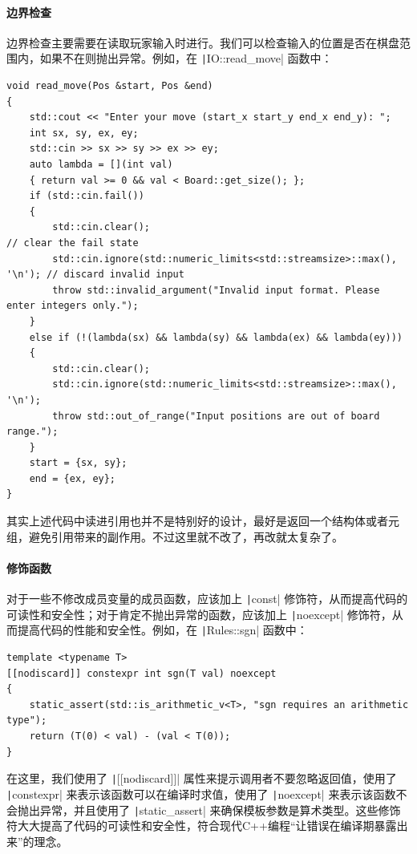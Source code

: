 \paragraph{边界检查} 
边界检查主要需要在读取玩家输入时进行。我们可以检查输入的位置是否在棋盘范围内，如果不在则抛出异常。例如，在 \texttt|IO::read_move| 函数中：
\begin{verbatim}
void read_move(Pos &start, Pos &end)
{
    std::cout << "Enter your move (start_x start_y end_x end_y): ";
    int sx, sy, ex, ey;
    std::cin >> sx >> sy >> ex >> ey;
    auto lambda = [](int val)
    { return val >= 0 && val < Board::get_size(); };
    if (std::cin.fail())
    {
        std::cin.clear();                                                   // clear the fail state
        std::cin.ignore(std::numeric_limits<std::streamsize>::max(), '\n'); // discard invalid input
        throw std::invalid_argument("Invalid input format. Please enter integers only.");
    }
    else if (!(lambda(sx) && lambda(sy) && lambda(ex) && lambda(ey)))
    {
        std::cin.clear();
        std::cin.ignore(std::numeric_limits<std::streamsize>::max(), '\n');
        throw std::out_of_range("Input positions are out of board range.");
    }
    start = {sx, sy};
    end = {ex, ey};
}
\end{verbatim}
其实上述代码中读进引用也并不是特别好的设计，最好是返回一个结构体或者元组，避免引用带来的副作用。不过这里就不改了，再改就太复杂了。

\paragraph{修饰函数}
对于一些不修改成员变量的成员函数，应该加上 \texttt|const| 修饰符，从而提高代码的可读性和安全性；对于肯定不抛出异常的函数，应该加上 \texttt|noexcept| 修饰符，从而提高代码的性能和安全性。例如，在 \texttt|Rules::sgn| 函数中：
\begin{verbatim}
template <typename T>
[[nodiscard]] constexpr int sgn(T val) noexcept
{
    static_assert(std::is_arithmetic_v<T>, "sgn requires an arithmetic type");
    return (T(0) < val) - (val < T(0));
}
\end{verbatim}
在这里，我们使用了 \texttt|[[nodiscard]]| 属性来提示调用者不要忽略返回值，使用了 \texttt|constexpr| 来表示该函数可以在编译时求值，使用了 \texttt|noexcept| 来表示该函数不会抛出异常，并且使用了 \texttt|static_assert| 来确保模板参数是算术类型。这些修饰符大大提高了代码的可读性和安全性，符合现代C++编程“让错误在编译期暴露出来”的理念。

